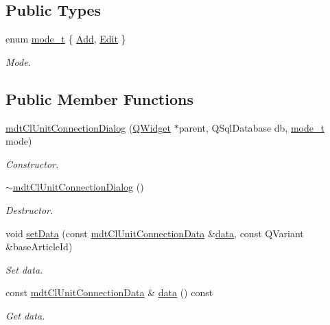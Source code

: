 \subsection*{Public Types}
\begin{DoxyCompactItemize}
\item 
enum \hyperlink{classmdt_cl_unit_connection_dialog_a754889f1591eddb79b69de4c51532f43}{mode\-\_\-t} \{ \hyperlink{classmdt_cl_unit_connection_dialog_a754889f1591eddb79b69de4c51532f43a65365660e45940b053efbf543aa2c10c}{Add}, 
\hyperlink{classmdt_cl_unit_connection_dialog_a754889f1591eddb79b69de4c51532f43a855eaf8093ea6043e46688cc5115643f}{Edit}
 \}
\begin{DoxyCompactList}\small\item\em Mode. \end{DoxyCompactList}\end{DoxyCompactItemize}
\subsection*{Public Member Functions}
\begin{DoxyCompactItemize}
\item 
\hyperlink{classmdt_cl_unit_connection_dialog_adf4b609e4ba336afd698f5d40744756c}{mdt\-Cl\-Unit\-Connection\-Dialog} (\hyperlink{class_q_widget}{Q\-Widget} $\ast$parent, Q\-Sql\-Database db, \hyperlink{classmdt_cl_unit_connection_dialog_a754889f1591eddb79b69de4c51532f43}{mode\-\_\-t} mode)
\begin{DoxyCompactList}\small\item\em Constructor. \end{DoxyCompactList}\item 
\hyperlink{classmdt_cl_unit_connection_dialog_a13e97c80ada11457bbf7b1c4173a09b1}{$\sim$mdt\-Cl\-Unit\-Connection\-Dialog} ()
\begin{DoxyCompactList}\small\item\em Destructor. \end{DoxyCompactList}\item 
void \hyperlink{classmdt_cl_unit_connection_dialog_a1692e64b3b636cd1e10df1da0ae7fdf5}{set\-Data} (const \hyperlink{classmdt_cl_unit_connection_data}{mdt\-Cl\-Unit\-Connection\-Data} \&\hyperlink{classmdt_cl_unit_connection_dialog_a32ab19b0b29e1d7b188518d26d6dd72e}{data}, const Q\-Variant \&base\-Article\-Id)
\begin{DoxyCompactList}\small\item\em Set data. \end{DoxyCompactList}\item 
const \hyperlink{classmdt_cl_unit_connection_data}{mdt\-Cl\-Unit\-Connection\-Data} \& \hyperlink{classmdt_cl_unit_connection_dialog_a32ab19b0b29e1d7b188518d26d6dd72e}{data} () const 
\begin{DoxyCompactList}\small\item\em Get data. \end{DoxyCompactList}\end{DoxyCompactItemize}


